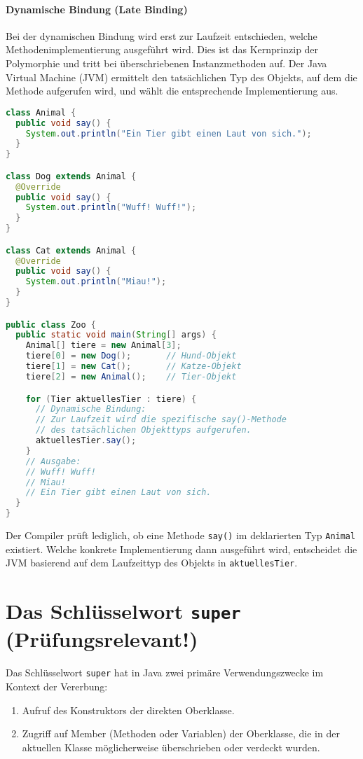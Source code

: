\paragraph{Dynamische Bindung (Late Binding)}
Bei der dynamischen Bindung wird erst zur Laufzeit entschieden, welche
Methodenimplementierung ausgeführt wird. Dies ist das Kernprinzip der
Polymorphie und tritt bei überschriebenen Instanzmethoden auf. Der Java Virtual
Machine (JVM) ermittelt den tatsächlichen Typ des Objekts, auf dem die Methode
aufgerufen wird, und wählt die entsprechende Implementierung aus.

\begin{lstlisting}[language=Java, caption={Beispiel für dynamische Bindung}]
class Animal {
  public void say() {
    System.out.println("Ein Tier gibt einen Laut von sich.");
  }
}

class Dog extends Animal {
  @Override
  public void say() {
    System.out.println("Wuff! Wuff!");
  }
}

class Cat extends Animal {
  @Override
  public void say() {
    System.out.println("Miau!");
  }
}

public class Zoo {
  public static void main(String[] args) {
    Animal[] tiere = new Animal[3];
    tiere[0] = new Dog();       // Hund-Objekt
    tiere[1] = new Cat();       // Katze-Objekt
    tiere[2] = new Animal();    // Tier-Objekt

    for (Tier aktuellesTier : tiere) {
      // Dynamische Bindung:
      // Zur Laufzeit wird die spezifische say()-Methode
      // des tatsächlichen Objekttyps aufgerufen.
      aktuellesTier.say();
    }
    // Ausgabe:
    // Wuff! Wuff!
    // Miau!
    // Ein Tier gibt einen Laut von sich.
  }
}
\end{lstlisting}
Der Compiler prüft lediglich, ob eine Methode \texttt{say()} im deklarierten
Typ \texttt{Animal} existiert. Welche konkrete Implementierung dann ausgeführt
wird, entscheidet die JVM basierend auf dem Laufzeittyp des Objekts in
\texttt{aktuellesTier}.

\section{Das Schlüsselwort \texttt{super} (Prüfungsrelevant!)}
\label{sec:super}

Das Schlüsselwort \texttt{super} hat in Java zwei primäre Verwendungszwecke im
Kontext der Vererbung:
\begin{enumerate}
  \item Aufruf des Konstruktors der direkten Oberklasse.
  \item Zugriff auf Member (Methoden oder Variablen) der Oberklasse, die in der
        aktuellen Klasse möglicherweise überschrieben oder verdeckt wurden.
\end{enumerate}

